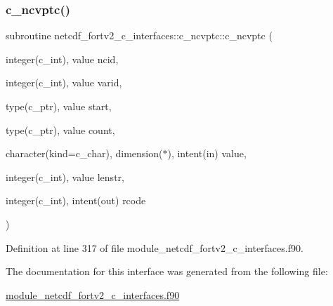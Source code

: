 \subsubsection{\texorpdfstring{c\+\_\+ncvptc()}{c\_ncvptc()}}
{\footnotesize\ttfamily subroutine netcdf\+\_\+fortv2\+\_\+c\+\_\+interfaces\+::c\+\_\+ncvptc\+::c\+\_\+ncvptc (\begin{DoxyParamCaption}\item[{integer(c\+\_\+int), value}]{ncid,  }\item[{integer(c\+\_\+int), value}]{varid,  }\item[{type(c\+\_\+ptr), value}]{start,  }\item[{type(c\+\_\+ptr), value}]{count,  }\item[{character(kind=c\+\_\+char), dimension($\ast$), intent(in)}]{value,  }\item[{integer(c\+\_\+int), value}]{lenstr,  }\item[{integer(c\+\_\+int), intent(out)}]{rcode }\end{DoxyParamCaption})}



Definition at line 317 of file module\+\_\+netcdf\+\_\+fortv2\+\_\+c\+\_\+interfaces.\+f90.



The documentation for this interface was generated from the following file\+:\begin{DoxyCompactItemize}
\item 
\hyperlink{module__netcdf__fortv2__c__interfaces_8f90}{module\+\_\+netcdf\+\_\+fortv2\+\_\+c\+\_\+interfaces.\+f90}\end{DoxyCompactItemize}
